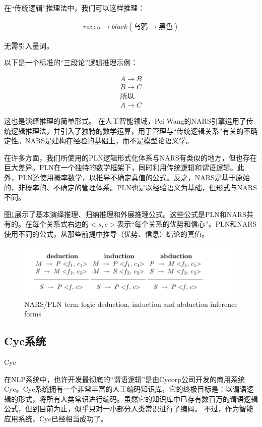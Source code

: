 在“传统逻辑”推理法中，我们可以这样推理：

\begin{eqnarray*}
raven \rightarrow black(乌鸦 \rightarrow 黑色)
\end{eqnarray*}

无需引入量词。

以下是一个标准的“三段论”逻辑推理示例：

\begin{eqnarray*}
A \rightarrow B \\
B \rightarrow C \\
所以\\
A \rightarrow C
\end{eqnarray*}


这也是演绎推理的简单形式。
在人工智能领域，Pei Wang的NARS引擎运用了传统逻辑推理法\cite{Wang2006}，并引入了独特的数学运算，用于管理与“传统逻辑关系”有关的不确定性。NARS是建构在经验的基础上，而不是模型论语义学。

在许多方面，我们所使用的PLN逻辑形式化体系与NARS有类似的地方，但也存在巨大差异。PLN在一个独特的数学框架下，同时利用传统逻辑和谓语逻辑。此外，PLN还使用概率数学，以推导不确定真值的公式。反之，NARS是基于原始的、非概率的、不确定的管理体系。PLN也是以经验语义为基础，但形式与NARS不同。


图\ref{fig:nars}展示了基本演绎推理、归纳推理和外展推理公式。这些公式是PLN和NARS共有的。在每个关系式右边的$<s,c>$表示“每个关系的优势和信心”。PLN和NARS使用不同的公式，从那些前提中推导（优势、信息）结论的真值。

\begin{figure}[htb]
\centering
\includegraphics[width=12cm]{figures/nars.png}
\caption{ NARS/PLN term logic deduction, induction and abduction inference forms }
\label{fig:nars}
\end{figure}

\subsection{Cyc系统}{Cyc}

在NLP系统中，也许开发最彻底的“谓语逻辑”是由Cycorp公司开发的商用系统Cyc\cite{Lenat1990}。Cyc系统拥有一个非常丰富的人工编码知识库，它的终极目标是：以谓语逻辑的形式，将所有人类常识进行编码。虽然它的知识库中已存有数百万的谓语逻辑公式，但到目前为止，似乎只对一小部分人类常识进行了编码。 不过，作为智能应用系统，Cyc已经相当成功了。

